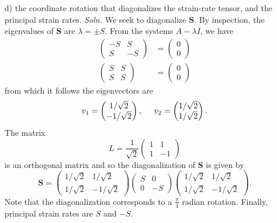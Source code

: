 \documentclass{article}
\begin{document}
\begin{itemize}
\begin{itemize}
        \item[d)] the coordinate rotation that diagonalizes the strain-rate tensor, and the principal strain rates.
        \newline\newline
        \textit{Soln.} We seek to diagonalize $\mathbf{S}$. By inspection, the eigenvalues of $\mathbf{S}$ are $\lambda = \pm S$. From the systems $A - \lambda I$, we have
        \begin{align*}
            \begin{pmatrix}
                -S & S\\
                S & -S
            \end{pmatrix} &= \begin{pmatrix}
                0\\
                0
            \end{pmatrix}\\
            \begin{pmatrix}
                S & S\\
                S & S
            \end{pmatrix} &= \begin{pmatrix}
                0\\
                0
            \end{pmatrix}
        \end{align*}
        from which it follows the eigenvectors are
        \[v_1 = \begin{pmatrix}
            1/\sqrt{2}\\
            -1/\sqrt{2}
        \end{pmatrix}, \hspace{0.5cm} v_2 = \begin{pmatrix}
            1/\sqrt{2}\\
            1/\sqrt{2}
        \end{pmatrix}.\]
        The matrix 
        \[L = \frac{1}{\sqrt{2}}\begin{pmatrix}
            1 & 1\\
            1 & -1
        \end{pmatrix}\]
        is an orthogonal matrix and so the diagonalization of $\mathbf{S}$ is given by
        \[\mathbf{S} = \begin{pmatrix}
            1/\sqrt{2} & 1/\sqrt{2}\\
            1/\sqrt{2} & -1/\sqrt{2}
        \end{pmatrix}\begin{pmatrix}
            S & 0\\
            0 & -S
        \end{pmatrix}\begin{pmatrix}
            1/\sqrt{2} & 1/\sqrt{2}\\
            1/\sqrt{2} & -1/\sqrt{2}
        \end{pmatrix}.\]
        Note that the diagonalization corresponds to a $\frac{\pi}{4}$ radian rotation.
        Finally, principal strain rates are $S$ and $-S$.
    \end{itemize}
    \pagebreak


\end{itemize}
\end{document}
